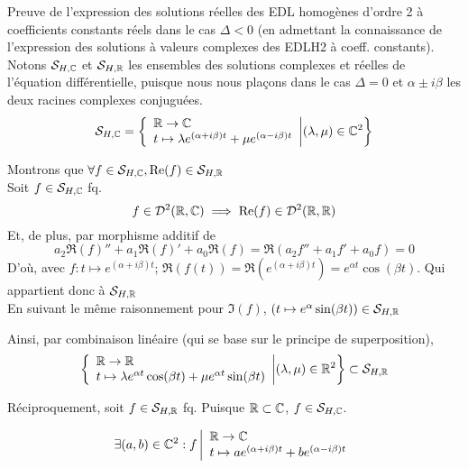 \documentclass{article}
\begin{document}
\maketitle

\flushleft

\begin{question_kholle}{Preuve de l’expression des solutions réelles des EDL homogènes d’ordre 2 à coefficients constants réels dans le cas $\Delta < 0$ (en admettant la connaissance de l’expression des solutions à valeurs complexes des EDLH2 à coeff. constants).}
	Notons $\mathcal S_{H, \mathbb C}$ et $\mathcal S_{H, \mathbb R}$ les ensembles des solutions complexes et réelles de l'équation différentielle, puisque nous nous plaçons dans le cas $\Delta = 0$ et $\alpha \pm i \beta$ les deux racines complexes conjuguées.
	$$
	\mathcal S_{H, \mathbb C} = 
	\left\{ 
	\begin{array}{l}
    \mathbb R \to \mathbb C  \\
    t \mapsto \lambda e^{(\alpha + i \beta) t}  + \mu e^{(\alpha - i \beta)t}
  \end{array}
	\middle\vert  (\lambda, \mu) \in \mathbb C ^2 \right\}	
	$$
	
	Montrons que $\forall f \in \mathcal S_{H ,\mathbb C}, \text{Re}(f) \in  \mathcal S_{H ,\mathbb R}$\\
	Soit $f \in \mathcal S_{H ,\mathbb C}$ fq.
	$$f \in \mathcal D^2(\mathbb R, \mathbb C) \implies \text{Re}(f) \in \mathcal D^2(\mathbb R, \mathbb R)$$
	Et, de plus, par morphisme additif de \Re
	$$
	a_2\Re(f)'' + a_1\Re(f)' + a_0\Re(f) = \Re( a_2 f'' + a_1 f' + a_0 f) = 0
	$$
	D'où, avec $f:t \mapsto e^{(\alpha + i \beta)t}$; $\Re(f(t)) = \Re(e^{(\alpha + i \beta)t}) = e^{\alpha t } \cos (\beta t)$. Qui appartient donc à $\mathcal S_{H, \mathbb R}$\\
	En suivant le même raisonnement pour $\Im(f)$, $(t \mapsto e^\alpha \sin(\beta t)) \in \mathcal S_{H, \mathbb R}$
	
	
	Ainsi, par combinaison linéaire (qui se base sur le principe de superposition),
	$$
	\left\{ 
	\begin{array}{l}
    \mathbb R \to \mathbb R  \\
    t \mapsto \lambda e^{\alpha t } \cos (\beta t)   + \mu e^{\alpha t } \sin (\beta t)
  \end{array}
	\middle\vert  (\lambda, \mu) \in \mathbb R ^2 \right\}
	\subset \mathcal S_{H ,\mathbb R}
	$$
	
	Réciproquement, soit $ f \in \mathcal S_{H ,\mathbb R}$ fq. Puisque $\mathbb R \subset \mathbb C$,  $ f \in \mathcal S_{H ,\mathbb C}$.
	
	$$
	\exists (a, b) \in \mathbb C^2 : f \left| \begin{array}{l}
    \mathbb R \to \mathbb C  \\
    t \mapsto a e^{(\alpha + i \beta) t}  + b e^{(\alpha - i \beta)t}
	\end{array}\right.$$


\end{question_kholle}
\end{document}
